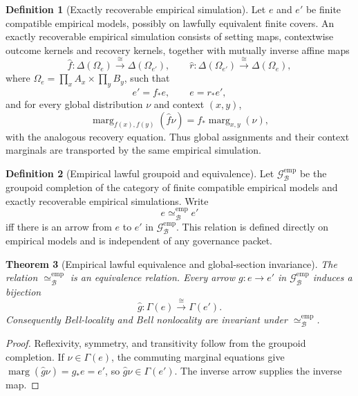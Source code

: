 \documentclass[11pt]{article}
\newtheorem{theorem}{Theorem}[section]
\theoremstyle{definition}
\newtheorem{definition}[theorem]{Definition}
\newcommand{\Bell}{\mathcal{B}}
\newcommand{\EmpLaw}{\mathscr{G}^{\mathrm{emp}}_{\Bell}}
\newcommand{\EmpEq}{\simeq^{\mathrm{emp}}_{\Bell}}
\newcommand{\GlobalSec}{\Gamma}
\begin{document}
\begin{definition}[Exactly recoverable empirical simulation]\label{def:empiricalsimulation}
Let $e$ and $e'$ be finite compatible empirical models, possibly on lawfully equivalent finite covers. An exactly recoverable empirical simulation consists of setting maps, contextwise outcome kernels and recovery kernels, together with mutually inverse affine maps
\[
\widehat f:\Delta(\Omega_e)\xrightarrow{\cong}\Delta(\Omega_{e'}),
\qquad
\widehat r:\Delta(\Omega_{e'})\xrightarrow{\cong}\Delta(\Omega_e),
\]
where $\Omega_e=\prod_xA_x\times\prod_yB_y$, such that
\[
e'=f_*e,\qquad e=r_*e',
\]
and for every global distribution $\nu$ and context $(x,y)$,
\[
\operatorname{marg}_{f(x),f(y)}(\widehat f\nu)
=f_*\operatorname{marg}_{x,y}(\nu),
\]
with the analogous recovery equation. Thus global assignments and their context marginals are transported by the same empirical simulation.
\end{definition}

\begin{definition}[Empirical lawful groupoid and equivalence]\label{def:empiricallawfulgroupoid}
Let $\EmpLaw$ be the groupoid completion of the category of finite compatible empirical models and exactly recoverable empirical simulations. Write
\[
e\EmpEq e'
\]
iff there is an arrow from $e$ to $e'$ in $\EmpLaw$. This relation is defined directly on empirical models and is independent of any governance packet.
\end{definition}

\begin{theorem}[Empirical lawful equivalence and global-section invariance]\label{thm:empiricalglobalinvariance}
The relation $\EmpEq$ is an equivalence relation. Every arrow $g:e\to e'$ in $\EmpLaw$ induces a bijection
\[
\widehat g:\GlobalSec(e)\xrightarrow{\cong}\GlobalSec(e').
\]
Consequently Bell-locality and Bell nonlocality are invariant under $\EmpEq$.
\end{theorem}
\begin{proof}
Reflexivity, symmetry, and transitivity follow from the groupoid completion. If $\nu\in\GlobalSec(e)$, the commuting marginal equations give
$\operatorname{marg}(\widehat g\nu)=g_*e=e'$, so $\widehat g\nu\in\GlobalSec(e')$. The inverse arrow supplies the inverse map.
\end{proof}
\end{document}
